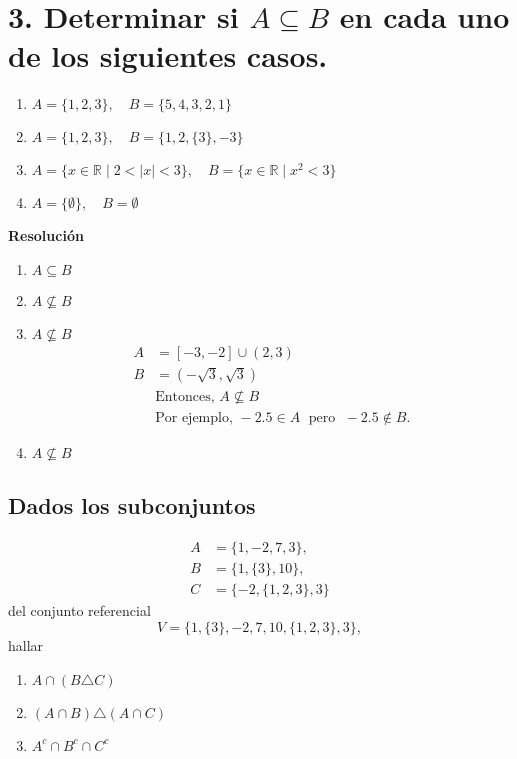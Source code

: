 \documentclass{article}
\begin{document}
\section*{3. Determinar si $A \subseteq B$ en cada uno de los siguientes casos.}

\begin{enumerate}[label=\roman*)]
    \item $A = \{1,2,3\}, \quad B = \{5,4,3,2,1\}$
    \item $A = \{1,2,3\}, \quad B = \{1,2,\{3\},-3\}$
    \item $A = \{x \in \mathbb{R} \mid 2 < |x| < 3\}, \quad B = \{x \in \mathbb{R} \mid x^2 < 3\}$
    \item $A = \{\emptyset\}, \quad B = \emptyset$
\end{enumerate}

\textbf{Resolución}
\begin{enumerate}[label=\roman*)]
    \item $A \subseteq B$
    \item $A \not\subseteq B$
    \item $A \not\subseteq B$
    \begin{align*}
        A &= [-3,-2] \cup (2,3) \\
        B &= (-\sqrt{3}, \sqrt{3}) \\[6pt]
        &\text{Entonces, } A \nsubseteq B \\
        &\text{Por ejemplo, } -2.5 \in A \;\text{ pero }\; -2.5 \notin B.
    \end{align*}
    \item $A \not\subseteq B$
\end{enumerate}

\subsection{Dados los subconjuntos}
\begin{align*}
A &= \{1,-2,7,3\}, \\
B &= \{1,\{3\},10\}, \\
C &= \{-2,\{1,2,3\},3\}
\end{align*}
del conjunto referencial
\[
V = \{1,\{3\},-2,7,10,\{1,2,3\},3\},
\]
hallar
\begin{enumerate}[label=\roman*)]
  \item $A \cap (B \triangle C)$
  \item $(A \cap B)\triangle (A \cap C)$
  \item $A^{c}\cap B^{c}\cap C^{c}$
\end{enumerate}
\end{document}

